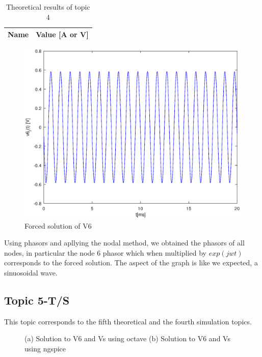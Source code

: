 \begin{table}[h]
  \centering
  \begin{tabular}{|l|r|}
    \hline    
    {\bf Name} & {\bf Value [A or V]} \\ \hline
    
  \end{tabular}
  \caption{Theoretical results of topic 4}
  \label{tab:tabela5}
\end{table}

\begin{figure}[ht] \centering
\includegraphics[width=0.5\linewidth]{v6_f.eps}
\caption{Forced solution of V6}
\label{fig:v6_f}
\end{figure}

Using phasors and apllying the nodal method, we obtained the phasors of all nodes, in particular the node 6 phasor which when multiplied
by $exp(jwt)$ corresponds to the forced solution. The aspect of the graph is like we expected, a sinuosoidal wave. 
\newpage
\subsection {Topic 5-T/S} 
This topic corresponds to the fifth theoretical and the fourth simulation topics.

\begin{figure}[h!]
            \centering
            \caption{(a) Solution to V6 and Vs using octave (b) Solution to V6 and Vs using ngspice}
            \label{fig:icer}
\end{figure}

